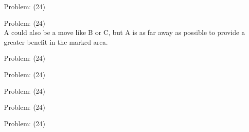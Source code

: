 \documentclass[11pt]{article}
\begin{document}
\begin{minipage}[t]{0.5\textwidth}
  {\centering
  
  Problem: (24)\\
  
  }
\end{minipage}
\begin{minipage}[t]{0.5\textwidth}
  {\centering
  
  Problem: (24)\\
  A could also be a move like B or C, but A is as far away as possible to provide a greater benefit in the marked area.\\
  }
\end{minipage}
\begin{minipage}[t]{0.5\textwidth}
  {\centering
  
  Problem: (24)\\
  
  }
\end{minipage}
\begin{minipage}[t]{0.5\textwidth}
  {\centering
  
  Problem: (24)\\
  
  }
\end{minipage}
\begin{minipage}[t]{0.5\textwidth}
  {\centering
  
  Problem: (24)\\
  
  }
\end{minipage}
\begin{minipage}[t]{0.5\textwidth}
  {\centering
  
  Problem: (24)\\
  
  }
\end{minipage}
\begin{minipage}[t]{0.5\textwidth}
  {\centering
  
  Problem: (24)\\
  
  }
\end{minipage}
\end{document}
